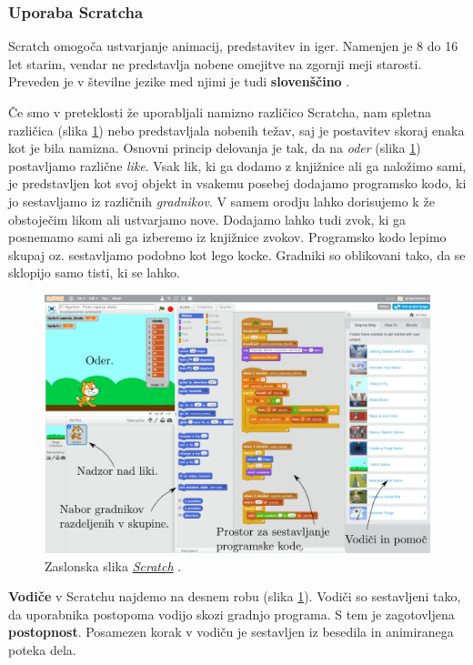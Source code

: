 \subsubsection{Uporaba Scratcha}
\label{sec:uporaba_scratcha}

Scratch omogoča ustvarjanje animacij, predstavitev in iger. Namenjen je
8 do 16 let starim, vendar ne predstavlja nobene omejitve na zgornji
meji starosti. Preveden je v številne jezike med njimi je tudi
\textbf{slovenščino} \cite{web:scratch:about}.

Če smo v preteklosti že uporabljali namizno različico Scratcha, nam
spletna različica (slika \ref{fig:web:scratch:orodje}) nebo
predstavljala nobenih težav, saj je postavitev skoraj enaka kot je
bila namizna. Osnovni princip delovanja je tak, da na \emph{oder}
(slika \ref{fig:web:scratch:orodje}) postavljamo različne
\emph{like}. Vsak lik, ki ga dodamo z knjižnice ali ga naložimo sami,
je predstavljen kot svoj objekt in vsakemu posebej dodajamo programsko
kodo, ki jo sestavljamo iz različnih \emph{gradnikov}. V samem orodju
lahko dorisujemo k že obstoječim likom ali ustvarjamo nove. Dodajamo
lahko tudi zvok, ki ga posnemamo sami ali ga izberemo iz knjižnice
zvokov.  Programsko kodo lepimo skupaj oz. sestavljamo podobno kot
lego kocke. Gradniki so oblikovani tako, da se sklopijo samo tisti, ki
se lahko.

\begin{figure}[h!]
  \centering
    \includegraphics [width=0.90\linewidth, keepaspectratio =
   1] {./images/sc_web/scratch_orodje-v021.png}
   \caption{Zaslonska slika
     \emph{\href{https://scratch.mit.edu/}{Scratch}}
     \cite{web:scratch}.}
    \label{fig:web:scratch:orodje}
\end{figure}

\textbf{Vodiče} v Scratchu najdemo na desnem robu (slika
\ref{fig:web:scratch:orodje}). Vodiči so sestavljeni tako, da
uporabnika postopoma vodijo skozi gradnjo programa. S tem je
zagotovljena \textbf{postopnost}. Posamezen korak v vodiču je
sestavljen iz besedila in animiranega poteka dela.

